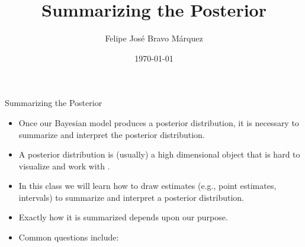\documentclass[handout]{beamer}
\title{Summarizing the Posterior}
\author[Felipe Bravo Márquez]{\footnotesize
 \textcolor[rgb]{0.00,0.00,1.00}{Felipe José Bravo Márquez}}
\date{ \today }
\begin{document}
\begin{frame}
\titlepage


\end{frame}




\begin{frame}{Summarizing the Posterior}
\scriptsize{
\begin{itemize}

\item Once our Bayesian model produces a posterior distribution, it is necessary to summarize and interpret the posterior distribution.

\item A posterior distribution is (usually) a high dimensional object that is hard to visualize and work with \cite{pml1Book}.

\item In this class we will learn how to draw estimates (e.g., point estimates, intervals) to summarize and interpret a posterior distribution.



\item Exactly how it is summarized depends upon our purpose.

\item Common questions include:
\begin{itemize}
\end{itemize}
 
\end{itemize}



} 

\end{frame}
\end{document}
